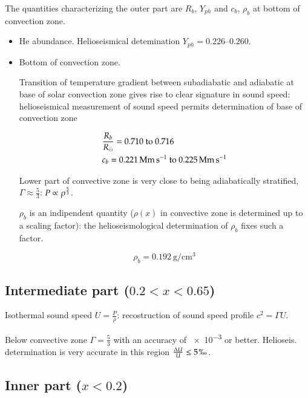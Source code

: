 \documentclass[../main.tex]{subfiles}
\begin{document}
The quantities characterizing the outer part are $R_b$, $Y_{ph}$ and $c_b$, $\rho_b$ at bottom of convection zone.

\begin{itemize}
    \item He abundance. Helioseismical detemination $Y_{ph}=\numrange{0.226}{0.260}$.
    
    \item Bottom of convection zone.
    
    Transition of temperature gradient between subadiabatic and adiabatic at base of solar convection zone gives rise to clear signature in sound speed: helioseismical measurement of sound speed permits determination of base of convection zone
    
    \begin{align*}
    &\frac{R_b}{\rsun{}}=\numrange{0.710}{0.716}\\
    &c_b=\SIrange{0.221}{0.225}{\mega\meter\per\second}
    \end{align*}
    
    Lower part of convective zone is very close to being adiabatically stratified, $\Gamma\approx\frac{5}{3}$: $P\propto\rho^{\frac{5}{3}}$.
    
    $\rho_b$ is an indipendent quantity ($\rho(x)$ in convective zone is determined up to a scaling factor): the helioseismological determination of $\rho_b$ fixes such a factor.
    
    \begin{equation*}
        \rho_b=\SI{0.192}{\gram\per\cubic\cm}
    \end{equation*}
    
\end{itemize}

\subsection{Intermediate part ($0.2<x<0.65$)}

Isothermal sound speed $U=\frac{P}{\rho}$: recostruction of sound speed profile $c^2=\Gamma U$.

Below convective zone $\Gamma=\frac{5}{3}$ with an accuracy of \num{e-3} or better. Helioseis. determination is very accurate in this region $\frac{\Delta U}{U}\leq5 \perthousand$.

\subsection{Inner part ($x<0.2$)}

\stopcontents[chapters]
\end{document}
